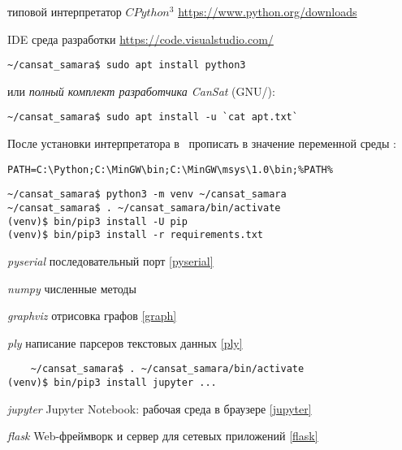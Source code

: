 \label{pyinst}\secdown

\begin{description}
    \item{типовой интерпретатор $CPython^3$} \url{https://www.python.org/downloads}
    \item{IDE среда разработки} \url{https://code.visualstudio.com/}
\end{description}

\begin{verbatim}
~/cansat_samara$ sudo apt install python3
\end{verbatim}
или \emph{полный комплект разработчика CanSat} (GNU/\linux):
\begin{verbatim}
~/cansat_samara$ sudo apt install -u `cat apt.txt`
\end{verbatim}

\noindent
После установки интерпретатора в \win\ прописать в 
значение переменной среды :
\begin{verbatim}
PATH=C:\Python;C:\MinGW\bin;C:\MinGW\msys\1.0\bin;%PATH%
\end{verbatim}


\begin{verbatim}
~/cansat_samara$ python3 -m venv ~/cansat_samara
~/cansat_samara$ . ~/cansat_samara/bin/activate
(venv)$ bin/pip3 install -U pip
(venv)$ bin/pip3 install -r requirements.txt
\end{verbatim}

\begin{description}
    \item{\emph{pyserial}}  последовательный порт \ref{pyserial}
    \item{\emph{numpy}}     численные методы
    \item{\emph{graphviz}}  отрисовка графов \ref{graph}
    \item{\emph{ply}}       написание парсеров текстовых данных \ref{ply}
\end{description}


\begin{verbatim}
    ~/cansat_samara$ . ~/cansat_samara/bin/activate
(venv)$ bin/pip3 install jupyter ...
\end{verbatim}

\begin{description}
    \item{\emph{jupyter}}   Jupyter Notebook: рабочая среда в браузере \ref{jupyter}
    \item{\emph{flask}}     Web-фреймворк и сервер для сетевых приложений \ref{flask}
\end{description}
    
\secup
